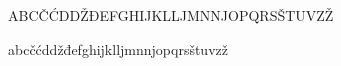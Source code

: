 \documentclass[a4paper,12pt]{article}
\begin{document}
ABCČĆDDŽĐEFGHIJKLLJMNNJOPQRSŠTUVZŽ

abcčćddžđefghijklljmnnjopqrsštuvzž
\end{document}
